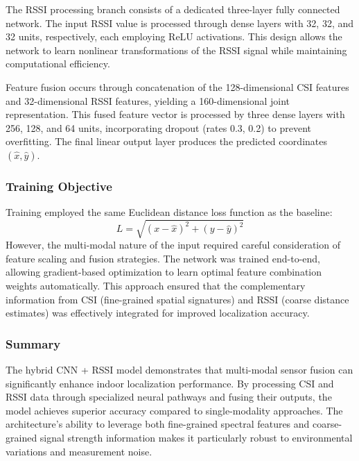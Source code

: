 The RSSI processing branch consists of a dedicated three-layer fully connected network. The input RSSI value is processed through dense layers with 32, 32, and 32 units, respectively, each employing ReLU activations. This design allows the network to learn nonlinear transformations of the RSSI signal while maintaining computational efficiency.

Feature fusion occurs through concatenation of the 128-dimensional CSI features and 32-dimensional RSSI features, yielding a 160-dimensional joint representation. This fused feature vector is processed by three dense layers with 256, 128, and 64 units, incorporating dropout (rates 0.3, 0.2) to prevent overfitting. The final linear output layer produces the predicted coordinates $(\hat{x}, \hat{y})$.

\subsubsection{Training Objective}
Training employed the same Euclidean distance loss function as the baseline:
\[
L = \sqrt{(x - \hat{x})^2 + (y - \hat{y})^2}
\]
However, the multi-modal nature of the input required careful consideration of feature scaling and fusion strategies. The network was trained end-to-end, allowing gradient-based optimization to learn optimal feature combination weights automatically. This approach ensured that the complementary information from CSI (fine-grained spatial signatures) and RSSI (coarse distance estimates) was effectively integrated for improved localization accuracy.

\subsubsection{Summary}
The hybrid CNN + RSSI model demonstrates that multi-modal sensor fusion can significantly enhance indoor localization performance. By processing CSI and RSSI data through specialized neural pathways and fusing their outputs, the model achieves superior accuracy compared to single-modality approaches. The architecture's ability to leverage both fine-grained spectral features and coarse-grained signal strength information makes it particularly robust to environmental variations and measurement noise.

